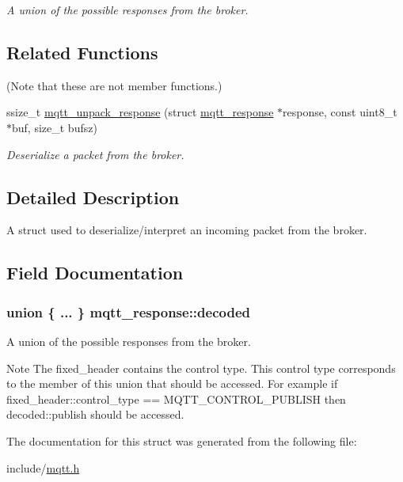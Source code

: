 \begin{DoxyCompactItemize}
\begin{tabbing}
\end{tabbing}\begin{DoxyCompactList}\small\item\em A union of the possible responses from the broker. \end{DoxyCompactList}\end{DoxyCompactItemize}
\subsection*{Related Functions}
(Note that these are not member functions.) \begin{DoxyCompactItemize}
\item 
ssize\+\_\+t \hyperlink{group__unpackers_gaae124a93579dcd31e6f52411f4582fbd}{mqtt\+\_\+unpack\+\_\+response} (struct \hyperlink{structmqtt__response}{mqtt\+\_\+response} $\ast$response, const uint8\+\_\+t $\ast$buf, size\+\_\+t bufsz)
\begin{DoxyCompactList}\small\item\em Deserialize a packet from the broker. \end{DoxyCompactList}\end{DoxyCompactItemize}


\subsection{Detailed Description}
A struct used to deserialize/interpret an incoming packet from the broker. 

\subsection{Field Documentation}
\subsubsection[{\texorpdfstring{decoded}{decoded}}]{\setlength{\rightskip}{0pt plus 5cm}union \{ ... \}   mqtt\+\_\+response\+::decoded}\hypertarget{structmqtt__response_a06d09e11b0023e31e281313df13184ff}{}\label{structmqtt__response_a06d09e11b0023e31e281313df13184ff}


A union of the possible responses from the broker. 

\begin{DoxyNote}{Note}
The fixed\+\_\+header contains the control type. This control type corresponds to the member of this union that should be accessed. For example if fixed\+\_\+header\+::control\+\_\+type == {\ttfamily M\+Q\+T\+T\+\_\+\+C\+O\+N\+T\+R\+O\+L\+\_\+\+P\+U\+B\+L\+I\+SH} then decoded\+::publish should be accessed. 
\end{DoxyNote}


The documentation for this struct was generated from the following file\+:\begin{DoxyCompactItemize}
\item 
include/\hyperlink{mqtt_8h}{mqtt.\+h}\end{DoxyCompactItemize}
